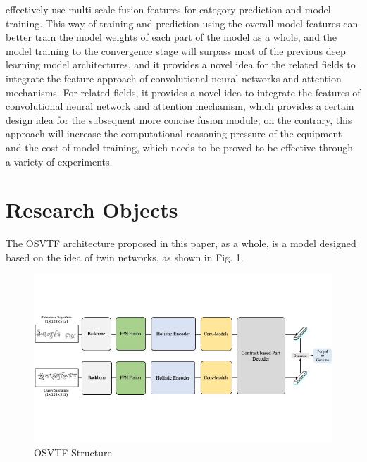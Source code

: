 effectively use multi-scale fusion features for category prediction and model training. This way of training and prediction using the overall model features can better train the model weights of each part of the model as a whole, and the model training to the convergence stage will surpass most of the previous deep learning model architectures, and it provides a novel idea for the related fields to integrate the feature approach of convolutional neural networks and attention mechanisms. For related fields, it provides a novel idea to integrate the features of convolutional neural network and attention mechanism, which provides a certain design idea for the subsequent more concise fusion module; on the contrary, this approach will increase the computational reasoning pressure of the equipment and the cost of model training, which needs to be proved to be effective through a variety of experiments.


\section{Research Objects}

The OSVTF architecture proposed in this paper, as a whole, is a model designed based on the idea of twin networks, as shown in Fig. 1.

\begin{figure}[htbp]
    \begin{center}
        \includegraphics[scale=0.6]{figure/OSVTF.jpg}
    \end{center}
    \caption{OSVTF Structure}
    \label{fig:OSVTF}
\end{figure}

